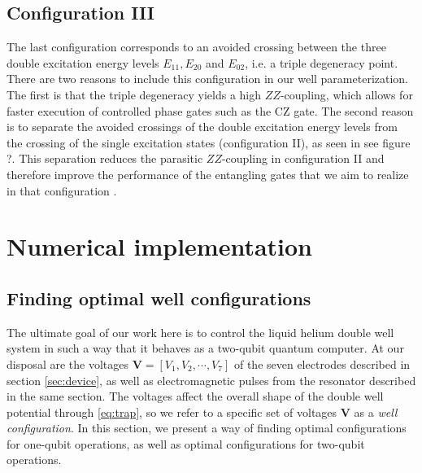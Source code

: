 \documentclass[twocolumn,superscriptaddress,unsortedaddress,
 amsmath,amssymb,
 aps,
]{revtex4-2}
\begin{document}
    \subsection{Configuration III}
        The last configuration corresponds to an avoided crossing between the three double excitation energy levels $E_{11}, E_{20}$ and $E_{02}$, i.e. a triple degeneracy point. There are two reasons to include this configuration in our well parameterization. The first is that the triple degeneracy yields a high $ZZ$-coupling, which allows for faster execution of controlled phase gates such as the CZ gate. The second reason is to separate the avoided crossings of the double excitation energy levels from the crossing of the single excitation states (configuration II), as seen in see figure ?. This separation reduces the parasitic $ZZ$-coupling in configuration II and therefore improve the performance of the entangling gates that we aim to realize in that configuration \cite{triple-avoided-crossing}. 
    


\section{Numerical implementation}

    \subsection{Finding optimal well configurations}
        
        The ultimate goal of our work here is to control the liquid helium double well system in such a way that it behaves as a two-qubit quantum computer. At our disposal are the voltages $\boldsymbol{V}=[V_1,V_2,\cdots,V_7]$ of the seven electrodes described in section \ref{sec:device}, as well as electromagnetic pulses from the resonator described in the same section. The voltages affect the overall shape of the double well potential through \eqref{eq:trap}, so we refer to a specific set of voltages $\boldsymbol{V}$ as a \textit{well configuration}. In this section, we present a way of finding optimal configurations for one-qubit operations, as well as optimal configurations for two-qubit operations.
        
\end{document}
